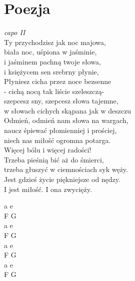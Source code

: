 \section{Poezja}
\noindent %
\begin{minipage}[t]{\dimexpr.4\textwidth-.4\columnsep}
    \ifchorded \textit{capo II}\\ \else \fi
    Ty przychodzisz jak noc majowa,\\
    biała noc, uśpiona w jaśminie,\\
    i jaśminem pachną twoje słowa,\\
    i księżycem sen srebrny płynie,\\
    \hfill\break
    Płyniesz cicha przez noce bezsenne\\
    - cichą nocą tak liście szeleszczą-\\
    szepcesz sny, szepcesz słowa tajemne,\\
    w słowach cichych skąpana jak w deszczu\\
    \hfill\break
    \small{Odmień, odmień nam słowa na wargach,}\\
    naucz śpiewać płomienniej i prościej,\\
    niech nas miłość ogromna potarga.\\
    Więcej bólu i więcej radości!\\
    \hfill\break
    Trzeba pieśnią bić aż do śmierci,\\
    trzeba głuszyć w ciemnościach syk węży.\\
    Jest gdzieś życie piękniejsze od nędzy.\\
    I jest miłość. I ona zwycięży.
\end{minipage}
\hfill
\begin{minipage}[t]{\dimexpr.05\textwidth-.05\columnsep}
    \ifchorded %
    \hfill\break
    a e\\
    F G\\
    a e\\
    F G\\
    \hfill\break
    a e\\
    F G\\
    a e\\
    F G\\
    \else
    \fi
\end{minipage}